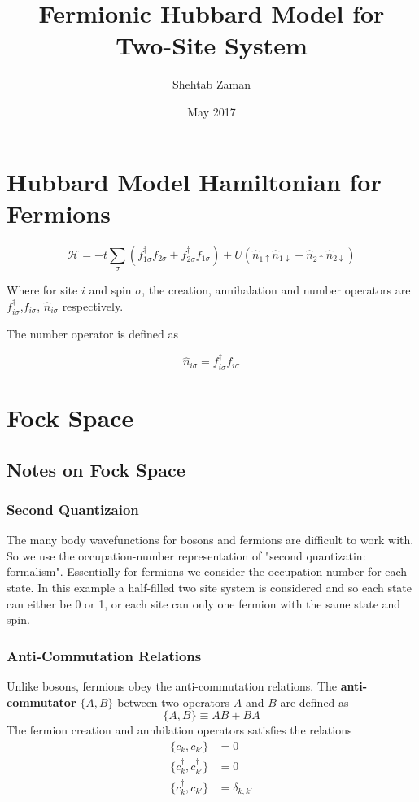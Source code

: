 \documentclass{article}
\title{Fermionic Hubbard Model for Two-Site System}
\author{Shehtab Zaman }
\date{May 2017}
\begin{document}
\maketitle
\section{Hubbard Model Hamiltonian for Fermions}

\begin{equation}
\mathcal{H} = -t\sum_{\sigma} \left(f_{1 \sigma} ^{\dagger}f_{2 \sigma}+f_{2 \sigma} ^{\dagger}f_{1 \sigma} \right)
+ U\left(\hat{n}_{1\uparrow} \hat{n}_{1\downarrow} + \hat{n}_{2\uparrow} \hat{n}_{2\downarrow} \right)
\end{equation}

Where for site $ i$ and spin $ \sigma$, the creation, annihalation and number
operators are $f_{i \sigma} ^{\dagger}$,$f_{i \sigma} $,
$ \hat{n}_{i\sigma}$  respectively.

The number operator is defined as

$$ \hat{n}_{i\sigma} = f_{i \sigma} ^{\dagger}f_{i \sigma}$$
\section{Fock Space}
\subsection{Notes on Fock Space}
\subsubsection{Second Quantizaion}
The many body wavefunctions for bosons and fermions are difficult to work
with. So we use the occupation-number representation of "second quantizatin: formalism".
Essentially for fermions we consider the occupation number for each state. In
this example a half-filled two site system is considered and so each state
can either be 0 or 1, or each site can only one fermion with the same state and spin.
\subsubsection{Anti-Commutation Relations}
Unlike bosons, fermions obey the anti-commutation relations. The \textbf{anti-commutator}
$\{A,B\} $ between two operators $ A$ and $ B$ are defined as
\begin{equation}
  \{A,B\}\equiv AB + BA
\end{equation}
The fermion creation and annhilation operators satisfies the relations
\begin{align}
  \{c_{k},c_{k\prime}\} &= 0 \\
  \{c^{\dagger}_{k},c^{\dagger}_{k\prime}\} &= 0 \\
  \{c^{\dagger}_{k},c_{k\prime}\} &= \delta_{k,k\prime}
\end{align}
\end{document}
